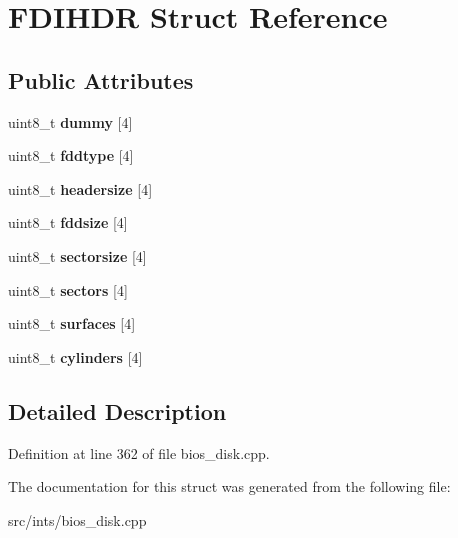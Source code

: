 \hypertarget{structFDIHDR}{\section{F\-D\-I\-H\-D\-R Struct Reference}
\label{structFDIHDR}
}
\subsection*{Public Attributes}
\begin{DoxyCompactItemize}
\item 
\hypertarget{structFDIHDR_a1c884cddb02c6661d8fc9f192b3fc22f}{uint8\-\_\-t {\bfseries dummy} \mbox{[}4\mbox{]}}\label{structFDIHDR_a1c884cddb02c6661d8fc9f192b3fc22f}

\item 
\hypertarget{structFDIHDR_a47545c8404b2ae2f8377e1bcc02fc8f0}{uint8\-\_\-t {\bfseries fddtype} \mbox{[}4\mbox{]}}\label{structFDIHDR_a47545c8404b2ae2f8377e1bcc02fc8f0}

\item 
\hypertarget{structFDIHDR_a09132fda6189c6cec4e4aa2d05868174}{uint8\-\_\-t {\bfseries headersize} \mbox{[}4\mbox{]}}\label{structFDIHDR_a09132fda6189c6cec4e4aa2d05868174}

\item 
\hypertarget{structFDIHDR_a0bc19446daf786a86e01fdfd0f396438}{uint8\-\_\-t {\bfseries fddsize} \mbox{[}4\mbox{]}}\label{structFDIHDR_a0bc19446daf786a86e01fdfd0f396438}

\item 
\hypertarget{structFDIHDR_ac0d70ea816470f23818e513aec16187a}{uint8\-\_\-t {\bfseries sectorsize} \mbox{[}4\mbox{]}}\label{structFDIHDR_ac0d70ea816470f23818e513aec16187a}

\item 
\hypertarget{structFDIHDR_a8df34ba3a180f2c436938eef65b1dd83}{uint8\-\_\-t {\bfseries sectors} \mbox{[}4\mbox{]}}\label{structFDIHDR_a8df34ba3a180f2c436938eef65b1dd83}

\item 
\hypertarget{structFDIHDR_a0075a0f7719ce25a93642b9db90d5000}{uint8\-\_\-t {\bfseries surfaces} \mbox{[}4\mbox{]}}\label{structFDIHDR_a0075a0f7719ce25a93642b9db90d5000}

\item 
\hypertarget{structFDIHDR_aed3de62f3b389214c84acec24434a0ee}{uint8\-\_\-t {\bfseries cylinders} \mbox{[}4\mbox{]}}\label{structFDIHDR_aed3de62f3b389214c84acec24434a0ee}

\end{DoxyCompactItemize}


\subsection{Detailed Description}


Definition at line 362 of file bios\-\_\-disk.\-cpp.



The documentation for this struct was generated from the following file\-:\begin{DoxyCompactItemize}
\item 
src/ints/bios\-\_\-disk.\-cpp\end{DoxyCompactItemize}
